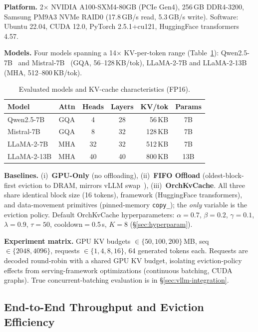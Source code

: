 \documentclass[conference]{IEEEtran}
\begin{document}
\textbf{Platform.} 2$\times$ NVIDIA A100-SXM4-80GB (PCIe Gen4), 256\,GB DDR4-3200, Samsung PM9A3 NVMe RAID0 (17.8\,GB/s read, 5.3\,GB/s write). Software: Ubuntu 22.04, CUDA 12.0, PyTorch 2.5.1+cu121, HuggingFace transformers 4.57.

\textbf{Models.} Four models spanning a 14$\times$ KV-per-token range (Table~\ref{tab:models}): Qwen2.5-7B~\cite{qwen2.5} and Mistral-7B~\cite{mistral} (GQA, 56--128\,KB/tok), LLaMA-2-7B and LLaMA-2-13B~\cite{llama2} (MHA, 512--800\,KB/tok).

\begin{table}[t]
\centering
\caption{Evaluated models and KV-cache characteristics (FP16).}
\label{tab:models}
\footnotesize
\setlength{\tabcolsep}{7pt}
\begin{tabular}{@{}lcccrc@{}}
\toprule
Model & Attn & Heads & Layers & KV/tok & Params \\
\midrule
Qwen2.5-7B   & GQA  & 4  & 28 & 56\,KB  & 7B  \\
Mistral-7B   & GQA  & 8  & 32 & 128\,KB & 7B  \\
LLaMA-2-7B   & MHA  & 32 & 32 & 512\,KB & 7B  \\
LLaMA-2-13B  & MHA  & 40 & 40 & 800\,KB & 13B \\
\bottomrule
\end{tabular}
\end{table}

\textbf{Baselines.} (i)~\textbf{GPU-Only} (no offloading), (ii)~\textbf{FIFO Offload} (oldest-block-first eviction to DRAM, mirrors vLLM swap~\cite{vllm}), (iii)~\textbf{OrchKvCache}. All three share identical block size (16 tokens), framework (HuggingFace transformers), and data-movement primitives (pinned-memory \texttt{copy\_}); the \emph{only} variable is the eviction policy. Default OrchKvCache hyperparameters: $\alpha{=}0.7$, $\beta{=}0.2$, $\gamma{=}0.1$, $\lambda{=}0.9$, $\tau{=}50$, cooldown$=$0.5\,s, $K{=}8$ (\S\ref{sec:hyperparam}).

\textbf{Experiment matrix.} GPU KV budgets $\in\{50, 100, 200\}$\,MB, seq $\in\{2048, 4096\}$, requests $\in\{1, 4, 8, 16\}$, 64 generated tokens each. Requests are decoded round-robin with a shared GPU KV budget, isolating eviction-policy effects from serving-framework optimizations (continuous batching, CUDA graphs). True concurrent-batching evaluation is in \S\ref{sec:vllm-integration}.

\subsection{End-to-End Throughput and Eviction Efficiency}
\label{sec:e2e}
\end{document}
